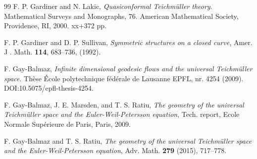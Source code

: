 \documentclass[12pt]{amsart}
\theoremstyle{plain}
\theoremstyle{definition}
\theoremstyle{remark}
\numberwithin{equation}{section} %
\numberwithin{figure}{section} %
\begin{document}
\begin{thebibliography}{99}
 F. P. Gardiner and N. Lakic, {\it Quasiconformal Teichmüller theory}. Mathematical Surveys and Monographs, 76. American Mathematical Society, Providence, RI, 2000. xx+372 pp. 


F. P. Gardiner and D. P. Sullivan, {\it Symmetric structures on a closed curve}, Amer. J . Math.
{\bf 114}, 683--736, (1992).

 F. Gay-Balmaz, \textit{Infinite dimensional geodesic flows and the universal Teichmüller space}. Th\`ese \'Ecole polytechnique f\'ed\'erale de Lausanne EPFL, nr. 4254 (2009). DOI:10.5075/epfl-thesis-4254.

 F. Gay-Balmaz, J. E. Marsden, and T. S. Ratiu, {\it The geometry of the universal Teichm\"uller space and the Euler-Weil-Petersson equation}, Tech. report, Ecole Normale Sup\'erieure de Paris, Paris, 2009.

 F. Gay-Balmaz and T. S. Ratiu, {\it The geometry of the universal Teichm\"uller space and the Euler-Weil-Petersson equation}, Adv. Math. {\bf 279} (2015), 717--778.








\end{thebibliography}
\end{document}
